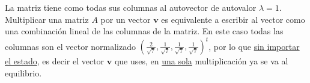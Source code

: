 \begin{enumerate}[label=(\alph*)]
        La matriz tiene como todas sus columnas al autovector de autovalor $\lambda = 1$. Multiplicar una matriz $A$ por un vector
        $\bm{v}$ es equivalente a escribir al vector como una combinación lineal de las columnas de la matriz. En este caso
        todas las columnas son el vector normalizado $(\frac{2}{\sqrt{7}},\frac{1}{\sqrt{7}},\frac{1}{\sqrt{7}},\frac{1}{\sqrt{7}})^t$,
        por lo que \underline{sin importar el estado}, es decir el vector $\bm{v}$ que uses, en \underline{una sola} multiplicación ya
        se va al equilibrio.
\end{enumerate}

\begin{aportes}
  \item {}
\end{aportes}
